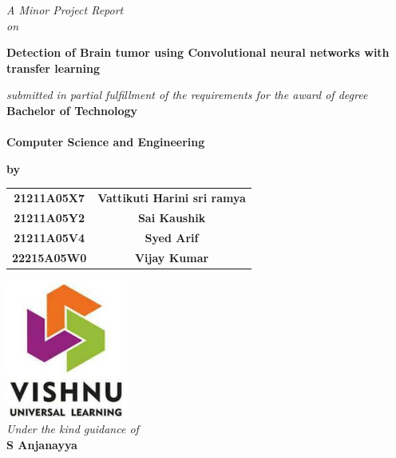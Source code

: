 \thispagestyle{empty} %


\begin{titlepage}
\begin{center}
        \textit{A Minor Project Report\\}
        \textit{on\\}
		\begin{LARGE}
		\bf{Detection of Brain tumor using Convolutional neural networks with transfer learning\\}
		\end{LARGE}
		\vspace{20pt}
		\textit{submitted in partial fulfillment of the requirements for the award of degree\\}
		\vspace{10pt}
		\textbf{\Large Bachelor of Technology\\}
		\vspace{4pt}
		\\
		\vspace{4pt}
		\textbf{\Large Computer Science and Engineering}\\
		\vspace{10pt}
		
		{\bf by} \\[1.0cm]
 
 \begin{table}[h!]
\begin{center}
\begin{tabular}{c c} 
 \textbf{\Large 21211A05X7} & \textbf{\Large Vattikuti Harini sri ramya}\\[0.5ex] 
 \textbf{\Large 21211A05Y2} & \textbf{\Large Sai Kaushik}\\[0.5ex]
 \textbf{\Large 21211A05V4} & \textbf{\Large Syed Arif}\\[0.5ex]
 \textbf{\Large 22215A05W0} & \textbf{\Large Vijay Kumar}
\end{tabular}
\end{center}
\end{table} 
		\vspace{10pt}
		\includegraphics[width=0.3\textwidth]{img/logo.jpg} \\
		\vspace{8pt}
		\textit{Under the kind guidance of}\\
		\textbf{\large S Anjanayya}\\
		

\end{center}
\end{titlepage}
